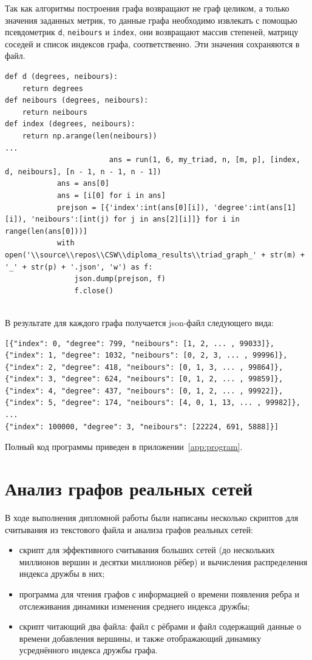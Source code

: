 \documentclass[bachelor, och, diploma]{SCWorks}
\begin{document}
Так как алгоритмы построения графа возвращают не граф целиком, а только значения заданных метрик, то данные графа необходимо извлекать с помощью псевдометрик \texttt{d}, \texttt{neibours} и \texttt{index}, они возвращают массив степеней, матрицу соседей и список индексов графа, соответственно. Эти значения сохраняются в файл.
\begin{verbatim}
def d (degrees, neibours):
    return degrees
def neibours (degrees, neibours):
    return neibours
def index (degrees, neibours):
    return np.arange(len(neibours))
...
						ans = run(1, 6, my_triad, n, [m, p], [index, d, neibours], [n - 1, n - 1, n - 1])
            ans = ans[0]
            ans = [i[0] for i in ans]
            prejson = [{'index':int(ans[0][i]), 'degree':int(ans[1][i]), 'neibours':[int(j) for j in ans[2][i]]} for i in range(len(ans[0]))]
            with open('\\source\\repos\\CSW\\diploma_results\\triad_graph_' + str(m) + '_' + str(p) + '.json', 'w') as f:
                json.dump(prejson, f)
                f.close()
    
\end{verbatim}

В результате для каждого графа получается json-файл следующего вида:
\begin{verbatim}
[{"index": 0, "degree": 799, "neibours": [1, 2, ... , 99033]}, 
{"index": 1, "degree": 1032, "neibours": [0, 2, 3, ... , 99996]}, 
{"index": 2, "degree": 418, "neibours": [0, 1, 3, ... , 99864]}, 
{"index": 3, "degree": 624, "neibours": [0, 1, 2, ... , 99859]}, 
{"index": 4, "degree": 437, "neibours": [0, 1, 2, ... , 99922]}, 
{"index": 5, "degree": 174, "neibours": [4, 0, 1, 13, ... , 99982]},
...
{"index": 100000, "degree": 3, "neibours": [22224, 691, 5888]}]
\end{verbatim}
Полный код программы приведен в приложении~\ref{app:program}.
\section{Анализ графов реальных сетей}
В ходе выполнения дипломной работы были написаны несколько скриптов для считывания из текстового файла и анализа графов реальных сетей:
\begin{itemize}
\item скрипт для эффективного считывания больших сетей (до нескольких миллионов вершин и десятки миллионов рёбер) и вычисления распределения индекса дружбы в них;
\item программа для чтения графов с информацией о времени появления ребра и отслеживания динамики изменения среднего индекса дружбы;
\item скрипт читающий два файла: файл с рёбрами и файл содержащий данные о времени добавления вершины, и также отображающий динамику усреднённого индекса дружбы графа.
\end{itemize}
\end{document}
